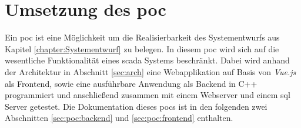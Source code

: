 \chapter{Umsetzung des \acl{poc}}
Ein \ac{poc} ist eine Möglichkeit um die Realisierbarkeit des Systementwurfs aus Kapitel \ref{chapter:Systementwurf} zu belegen.
In diesem  \ac{poc} wird sich auf die wesentliche Funktionalität eines \ac{scada} Systems beschränkt.
Dabei wird anhand der Architektur in Abschnitt \ref{sec:arch} eine Webapplikation auf Basis von \emph{Vue.js} als Frontend, sowie eine ausführbare Anwendung als Backend in C++ programmiert und anschließend zusammen mit einem Webserver und einem \ac{sql} Server getestet.
Die Dokumentation dieses \acp{poc} ist in den folgenden zwei Abschnitten \ref{sec:poc:backend} und \ref{sec:poc:frontend} enthalten.


